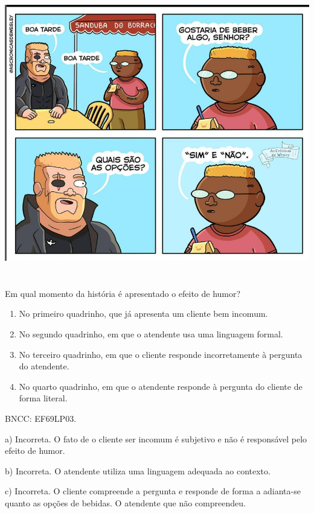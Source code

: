 \includegraphics[width=5.90556in,height=4.96042in]{./imgSAEB_6_POR/media/image42.png}


Em qual momento da história é apresentado o efeito de humor?

\begin{enumerate}
\def\labelenumi{\alph{enumi})}
\item
  No primeiro quadrinho, que já apresenta um cliente bem incomum.
\item
  No segundo quadrinho, em que o atendente usa uma linguagem formal.
\item
  No terceiro quadrinho, em que o cliente responde incorretamente à
  pergunta do atendente.
\item
  No quarto quadrinho, em que o atendente responde à pergunta do cliente
  de forma literal.
\end{enumerate}

BNCC: EF69LP03.

a) Incorreta. O fato de o cliente ser incomum é subjetivo e não é
responsável pelo efeito de humor.

b) Incorreta. O atendente utiliza uma linguagem adequada ao contexto.

c) Incorreta. O cliente compreende a pergunta e responde de forma a
adianta-se quanto as opções de bebidas. O atendente que não compreendeu.

